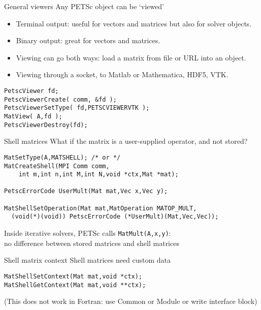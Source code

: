 \begin{longversion}
\begin{numberedframe}{General viewers}
  Any PETSc object can be `viewed'
  \begin{itemize}
  \item Terminal output: useful for vectors and matrices but also for
    solver objects.
  \item Binary output: great for vectors and matrices.
  \item Viewing can go both ways: load a matrix from file or URL into
    an object.
  \item Viewing through a socket, to Matlab or Mathematica, HDF5, VTK.
  \end{itemize}
\begin{lstlisting}
PetscViewer fd;
PetscViewerCreate( comm, &fd );
PetscViewerSetType( fd,PETSCVIEWERVTK );
MatView( A,fd );
PetscViewerDestroy(fd);
\end{lstlisting}
\end{numberedframe}



\begin{numberedframe}{Shell matrices}
What if the matrix is a user-supplied operator, and not stored?

\begin{lstlisting}
MatSetType(A,MATSHELL); /* or */
MatCreateShell(MPI Comm comm,
    int m,int n,int M,int N,void *ctx,Mat *mat);

PetscErrorCode UserMult(Mat mat,Vec x,Vec y);

MatShellSetOperation(Mat mat,MatOperation MATOP_MULT,
  (void(*)(void)) PetscErrorCode (*UserMult)(Mat,Vec,Vec));
\end{lstlisting}
Inside iterative solvers, PETSc calls \lstinline{MatMult(A,x,y)}: \\
no difference between stored matrices and shell matrices
\end{numberedframe}

\begin{numberedframe}{Shell matrix context}
Shell matrices need custom data
\begin{lstlisting}
MatShellSetContext(Mat mat,void *ctx);
MatShellGetContext(Mat mat,void **ctx);
\end{lstlisting}
(This does not work in Fortran: use Common or Module
or write interface block)


\end{numberedframe}
\end{longversion}
